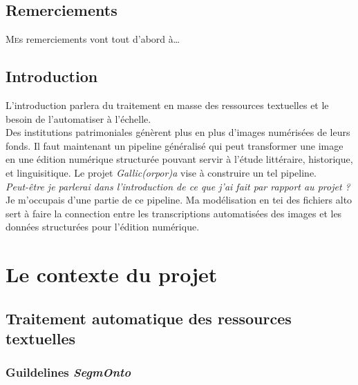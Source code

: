 \documentclass[a4paper,12pt,twoside]{book}
\begin{document}
	\chapter{Remerciements}
	
	\lettrine{M}es remerciements vont tout d'abord à\dots
	
	
	\chapter{Introduction}
	
L'introduction parlera du traitement en masse des ressources textuelles et le besoin de l'automatiser à l'échelle.\\

Des institutions patrimoniales génèrent plus en plus d'images numérisées de leurs fonds. Il faut maintenant un pipeline généralisé qui peut transformer une image en une édition numérique structurée pouvant servir à l'étude littéraire, historique, et linguisitique. Le projet \textit{Gallic(orpor)a} vise à construire un tel pipeline.\\

\textit{Peut-être je parlerai dans l'introduction de ce que j'ai fait par rapport au projet ?}\\

Je m'occupais d'une partie de ce pipeline. Ma modélisation en \acrshort{tei} des fichiers \acrshort{alto} sert à faire la connection entre les transcriptions automatisées des images et les données structurées pour l'édition numérique.
	
	\thispagestyle{empty}
	\cleardoublepage
	
	\mainmatter
	
	\part{Le contexte du projet}
	
	\chapter{Traitement automatique des ressources textuelles}
	
	\section{Guildelines \textit{SegmOnto}}
	
\end{document}
